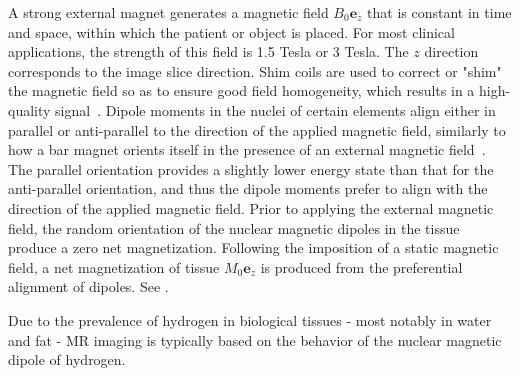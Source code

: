 A strong external magnet generates a magnetic field $B_0\bm{e}_z$ that is constant in time and space, within which the patient or object is placed. For most clinical applications, the strength of this field is 1.5 Tesla or 3 Tesla. The $z$ direction corresponds to the image slice direction. Shim coils are used to correct or "shim" the magnetic field so as to ensure good field homogeneity, which results in a high-quality signal~\cite{jacobs_2007}. Dipole moments in the nuclei of certain elements align either in parallel or anti-parallel to the direction of the applied magnetic field, similarly to how a bar magnet orients itself in the presence of an external magnetic field~\cite{hendrick_1994}. The parallel orientation provides a slightly lower energy state than that for the anti-parallel orientation, and thus the dipole moments prefer to align with the direction of the applied magnetic field. Prior to applying the external magnetic field, the random orientation of the nuclear magnetic dipoles in the tissue produce a zero net magnetization. Following the imposition of a static magnetic field, a net magnetization of tissue $M_0\bm{e}_z$ is produced from the preferential alignment of dipoles. See .

Due to the prevalence of hydrogen in biological tissues - most notably in water and fat - MR imaging is typically based on the behavior of the nuclear magnetic dipole of hydrogen.

